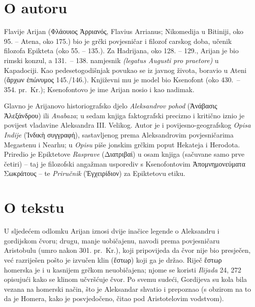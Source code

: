 \section*{O autoru}

Flavije Arijan \textgreek[variant=ancient]{(Φλάουιος Ἀρριανός,} Flavius Arrianus; Nikomedija u Bitiniji, oko 95. – Atena, oko 175.) bio je grčki povjesničar i filozof carskog doba, učenik filozofa Epikteta (oko 55. – 135.). Za Hadrijana, oko 128. – 129., Arijan je bio rimski konzul, a 131.\ – 138. namjesnik \textit{(legatus Augusti pro praetore)} u Kapadociji. Kao pedesetogodišnjak povukao se iz javnog života, boravio u Ateni (ἄρχων ἐπώνυμος 145./146.). Književni mu je model bio Ksenofont (oko 430.\ – 354. pr.~Kr.); Ksenofontovo je ime Arijan nosio i kao nadimak.

Glavno je Arijanovo historiografsko djelo \textit{Aleksandrov pohod} \textgreek[variant=ancient]{(Ἀνάβασις Ἀλεξάνδρου)} ili \textit{Anabaza}; u sedam knjiga faktografski precizno i kritično iznio je povijest vladavine Aleksandra III. Velikog. Autor je i povijesno-geografskog \textit{Opisa Indije} \textgreek[variant=ancient]{(Ἰνδικὴ συγγραφή),} sastavljenog prema Aleksandrovim povjesničarima Megastenu i Nearhu; u \textit{Opisu} piše jonskim grčkim poput Hekateja i Herodota. Priredio je Epiktetove \textit{Rasprave} \textgreek[variant=ancient]{(Διατριβαί)} u osam knjiga (sačuvane samo prve četiri) – taj je filozofski angažman usporediv s Ksenofontovim \textgreek[variant=ancient]{Ἀπομνημονεύματα Σωκράτους} – te \textit{Priručnik} \textgreek[variant=ancient]{(Ἐγχειρίδιον)} za Epiktetovu etiku.

\section*{O tekstu}

U sljedećem odlomku Arijan iznosi dvije inačice legende o Aleksandru i gordijskom čvoru; drugu, manje uobičajenu, navodi prema povjesničaru Aristobulu (umro nakon 301. pr.~Kr.), koji pripovijeda da čvor nije bio presječen, već razriješen pošto je izvučen klin \textgreek[variant=ancient]{(ἕστωρ)} koji ga je držao. Riječ \textgreek[variant=ancient]{ἕστωρ} homerska je i u kasnijem grčkom neuobičajena; njome se koristi \textit{Ilijada} 24, 272 opisujući kako se klinom učvršćuje čvor. Po svemu sudeći, Gordijeva su kola bila vezana na homerski način, što je Aleksandar shvatio i prepoznao (s obzirom na to da je Homera, kako je posvjedočeno, čitao pod Aristotelovim vodstvom). 

